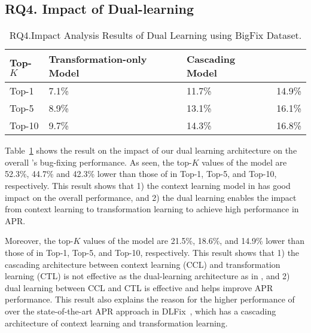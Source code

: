 \subsection{\bf RQ4. Impact of Dual-learning}



\begin{table}[t]
  \caption{RQ4.Impact Analysis Results of Dual Learning using BigFix Dataset.}
  \vspace{-6pt}
	{\small
		\begin{center}
			\renewcommand{\arraystretch}{1}
			\begin{tabular}{p{1cm}<{\centering}|p{2.7cm}<{\centering}|p{1.7cm}<{\centering}|p{1cm}<{\centering}}
				\hline
				Top-$K$ & Transformation-only Model & Cascading Model &  \tool \\			
				\hline
				Top-1   & 7.1\% & 11.7\% & 14.9\% \\ \hline
				Top-5	& 8.9\% & 13.1\% & 16.1\% \\ \hline
				Top-10	& 9.7\% & 14.3\% & 16.8\%\\ \hline
			
				\hline
			\end{tabular}
			\label{fig:rq4_results}
		\end{center}
	}
\end{table}

Table~\ref{fig:rq4_results} shows the result on the impact of our dual
learning architecture on the overall {\tool}'s bug-fixing performance.
As seen, the top-$K$ values of the  model
are 52.3\%, 44.7\% and 42.3\% lower than those of {\tool} in Top-1,
Top-5, and Top-10, respectively. This result shows that 1) the context
learning model in {\tool} has good impact on the overall performance,
and 2) the dual learning enables the impact from context learning to
transformation learning to achieve high performance in APR.

Moreover, the top-$K$ values of the  model are 21.5\%,
18.6\%, and 14.9\% lower than those of {\tool} in Top-1, Top-5, and
Top-10, respectively. This result shows that 1) the cascading
architecture between context learning (CCL) and transformation
learning (CTL) is not effective as the dual-learning architecture as
in {\tool}, and 2) dual learning between CCL and CTL is effective and
helps improve APR performance. This result also explains the reason
for the higher performance of {\tool} over the state-of-the-art APR
approach in DLFix~\cite{icse20}, which has a cascading architecture of
context learning and transformation learning.



